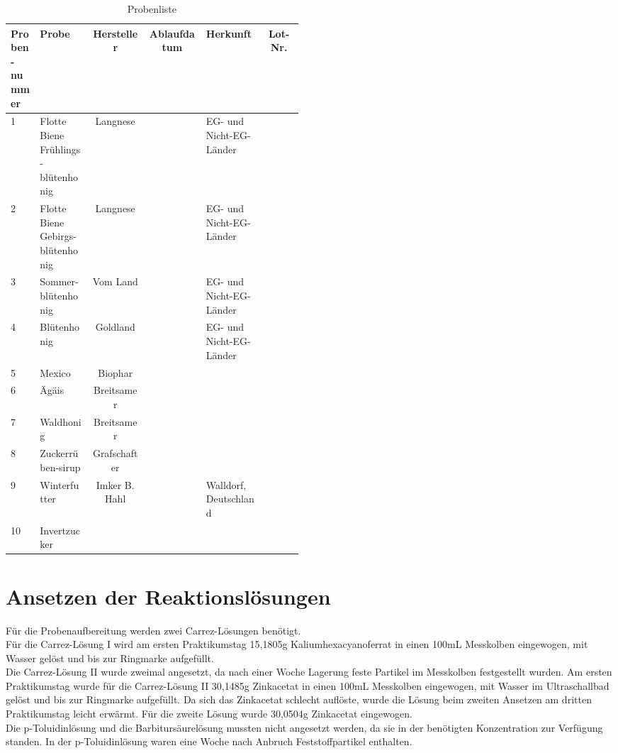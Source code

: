 \begin{table}[htbp]
	\centering
		\begin{tabular}{p{0.1\linewidth}|p{0.18\linewidth}|c|c|p{0.2\linewidth}|c} 
			Proben-nummer & Probe & Hersteller & Ablaufdatum & Herkunft & Lot-Nr.\\
			\hline
			1 & Flotte Biene Frühlings-blütenhonig & Langnese &  & EG- und Nicht-EG-Länder & \\
			\hline
			2 & Flotte Biene Gebirgs-blütenhonig & Langnese &  & EG- und Nicht-EG-Länder & \\
			\hline
			3 & Sommer-blütenhonig & Vom Land &  & EG- und Nicht-EG-Länder & \\
			\hline
			4 & Blütenhonig & Goldland &  & EG- und Nicht-EG-Länder & \\
			\hline
			5 & Mexico & Biophar &  &  & \\
			\hline
			6 & Ägäis & Breitsamer &  &  & \\
			\hline
			7 & Waldhonig & Breitsamer &  &  & \\
			\hline
			8 & Zuckerrüben-sirup & Grafschafter &  &  & \\
			\hline
			9 & Winterfutter & Imker B. Hahl &  & Walldorf, Deutschland & \\
			\hline
			10 & Invertzucker &  &  &  & \\
		\end{tabular}
	\caption{Probenliste}
	\label{tab:Probenliste}
\end{table}


\section{Ansetzen der Reaktionslösungen}

Für die Probenaufbereitung werden zwei Carrez-Lösungen benötigt.\\ 
Für die Carrez-Lösung I wird am ersten Praktikumstag 15,1805g Kaliumhexacyanoferrat in einen 100mL Messkolben eingewogen, mit Wasser gelöst und bis zur Ringmarke aufgefüllt.\\ 
Die Carrez-Lösung II wurde zweimal angesetzt, da nach einer Woche Lagerung feste Partikel im Messkolben festgestellt wurden. Am ersten Praktikumstag wurde für die Carrez-Lösung II 30,1485g Zinkacetat in einen 100mL Messkolben eingewogen, mit Wasser im Ultraschallbad gelöst und bis zur Ringmarke aufgefüllt. Da sich das Zinkacetat schlecht auflöste, wurde die Lösung beim zweiten Ansetzen am dritten Praktikumstag leicht erwärmt. Für die zweite Lösung wurde 30,0504g Zinkacetat eingewogen.\\ 
Die p-Toluidinlösung und die Barbitursäurelösung mussten nicht angesetzt werden, da sie in der benötigten Konzentration zur Verfügung standen. In der p-Toluidinlösung waren eine Woche nach Anbruch Feststoffpartikel enthalten.

